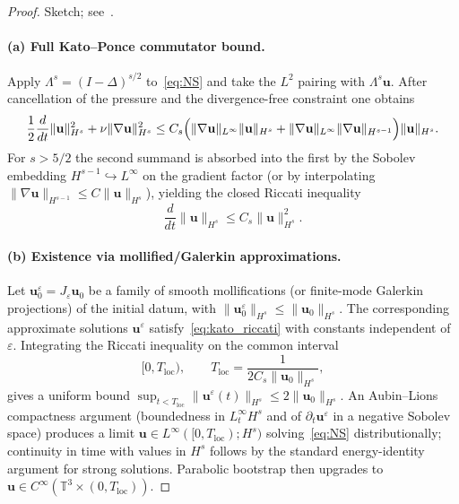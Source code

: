 \documentclass[11pt,a4paper]{article}
\begin{document}
\begin{proof}
Sketch; see~\cite{Kato1972,KatoPonce1988}.

\paragraph{(a) Full Kato--Ponce commutator bound.}
Apply \(\Lambda^s=(I-\Delta)^{s/2}\) to~\eqref{eq:NS} and take the \(L^2\) pairing with \(\Lambda^s\mathbf{u}\). After cancellation of the pressure and the divergence-free constraint one obtains
\[
\frac12\frac{d}{dt}\|\mathbf{u}\|_{H^s}^2+\nu\|\nabla\mathbf{u}\|_{H^s}^2
\le C_s\Bigl(\|\nabla\mathbf{u}\|_{L^\infty}\|\mathbf{u}\|_{H^s}+\|\nabla\mathbf{u}\|_{L^\infty}\|\nabla\mathbf{u}\|_{H^{s-1}}\Bigr)\|\mathbf{u}\|_{H^s}.
\]
For \(s>5/2\) the second summand is absorbed into the first by the Sobolev embedding \(H^{s-1}\hookrightarrow L^\infty\) on the gradient factor (or by interpolating \(\|\nabla\mathbf{u}\|_{H^{s-1}}\le C\|\mathbf{u}\|_{H^s}\)), yielding the closed Riccati inequality
\begin{equation}\label{eq:kato_riccati}
\frac{d}{dt}\|\mathbf{u}\|_{H^s}\le C_s\|\mathbf{u}\|_{H^s}^2.
\end{equation}

\paragraph{(b) Existence via mollified/Galerkin approximations.}
Let \(\mathbf{u}_0^\varepsilon=J_\varepsilon\mathbf{u}_0\) be a family of smooth mollifications (or finite-mode Galerkin projections) of the initial datum, with \(\|\mathbf{u}_0^\varepsilon\|_{H^s}\le\|\mathbf{u}_0\|_{H^s}\). The corresponding approximate solutions \(\mathbf{u}^\varepsilon\) satisfy~\eqref{eq:kato_riccati} with constants independent of \(\varepsilon\). Integrating the Riccati inequality on the common interval
\[
\bigl[0,T_{\mathrm{loc}}\bigr),\qquad T_{\mathrm{loc}}=\frac{1}{2C_s\|\mathbf{u}_0\|_{H^s}},
\]
gives a uniform bound \(\sup_{t<T_{\mathrm{loc}}}\|\mathbf{u}^\varepsilon(t)\|_{H^s}\le 2\|\mathbf{u}_0\|_{H^s}\). An Aubin--Lions compactness argument (boundedness in \(L^\infty_t H^s\) and of \(\partial_t\mathbf{u}^\varepsilon\) in a negative Sobolev space) produces a limit \(\mathbf{u}\in L^\infty([0,T_{\mathrm{loc}});H^s)\) solving~\eqref{eq:NS} distributionally; continuity in time with values in \(H^s\) follows by the standard energy-identity argument for strong solutions. Parabolic bootstrap then upgrades to \(\mathbf{u}\in C^\infty(\mathbb{T}^3\times(0,T_{\mathrm{loc}}))\).


\end{proof}
\end{document}

